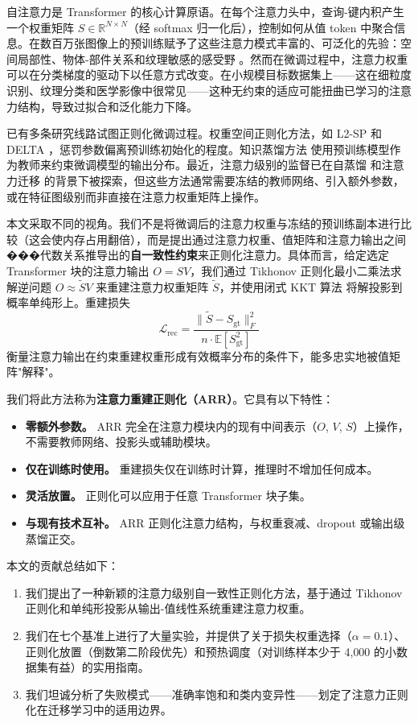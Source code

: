\documentclass[preprint,12pt]{elsarticle}
\begin{document}
自注意力是 Transformer 的核心计算原语。在每个注意力头中，查询-键内积产生一个权重矩阵 $S \in \mathbb{R}^{N \times N}$（经 softmax 归一化后），控制如何从值 token 中聚合信息。在数百万张图像上的预训练赋予了这些注意力模式丰富的、可泛化的先验：空间局部性、物体-部件关系和纹理敏感的感受野 \cite{raghu2021vision,park2022vision}。然而在微调过程中，注意力权重可以在分类梯度的驱动下以任意方式改变。在小规模目标数据集上——这在细粒度识别、纹理分类和医学影像中很常见——这种无约束的适应可能扭曲已学习的注意力结构，导致过拟合和泛化能力下降。

已有多条研究线路试图正则化微调过程。权重空间正则化方法，如 L2-SP \cite{li2018explicit} 和 DELTA \cite{li2019delta}，惩罚参数偏离预训练初始化的程度。知识蒸馏方法 \cite{hinton2015distilling} 使用预训练模型作为教师来约束微调模型的输出分布。最近，注意力级别的监督已在自蒸馏 \cite{zhang2019your} 和注意力迁移 \cite{zagoruyko2017paying} 的背景下被探索，但这些方法通常需要冻结的教师网络、引入额外参数，或在特征图级别而非直接在注意力权重矩阵上操作。

本文采取不同的视角。我们不是将微调后的注意力权重与冻结的预训练副本进行比较（这会使内存占用翻倍），而是提出通过注意力权重、值矩阵和注意力输出之间���代数关系推导出的\textbf{自一致性约束}来正则化注意力。具体而言，给定选定 Transformer 块的注意力输出 $O = SV$，我们通过 Tikhonov 正则化最小二乘法求解逆问题 $O \approx \tilde{S}V$ 来重建注意力权重矩阵 $\tilde{S}$，并使用闭式 KKT 算法 \cite{duchi2008efficient} 将解投影到概率单纯形上。重建损失
\begin{equation}
\mathcal{L}_{\mathrm{rec}} = \frac{\|\tilde{S} - S_{\mathrm{gt}}\|_F^2}{n \cdot \mathbb{E}[S_{\mathrm{gt}}^2]}
\end{equation}
衡量注意力输出在约束重建权重形成有效概率分布的条件下，能多忠实地被值矩阵"解释"。

我们将此方法称为\textbf{注意力重建正则化（ARR）}。它具有以下特性：
\begin{itemize}
    \item \textbf{零额外参数。} ARR 完全在注意力模块内的现有中间表示（$O$, $V$, $S$）上操作，不需要教师网络、投影头或辅助模块。
    \item \textbf{仅在训练时使用。} 重建损失仅在训练时计算，推理时不增加任何成本。
    \item \textbf{灵活放置。} 正则化可以应用于任意 Transformer 块子集。
    \item \textbf{与现有技术互补。} ARR 正则化注意力结构，与权重衰减、dropout 或输出级蒸馏正交。
\end{itemize}

本文的贡献总结如下：
\begin{enumerate}
    \item 我们提出了一种新颖的注意力级别自一致性正则化方法，基于通过 Tikhonov 正则化和单纯形投影从输出-值线性系统重建注意力权重。
    \item 我们在七个基准上进行了大量实验，并提供了关于损失权重选择（$\alpha = 0.1$）、正则化放置（倒数第二阶段优先）和预热调度（对训练样本少于 4{,}000 的小数据集有益）的实用指南。
    \item 我们坦诚分析了失败模式——准确率饱和和类内变异性——划定了注意力正则化在迁移学习中的适用边界。
\end{enumerate}
\end{document}
